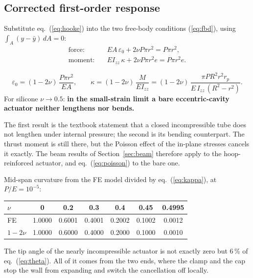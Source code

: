 \documentclass[11pt,a4paper]{article}
\numberwithin{equation}{section}
\newcommand{\Izz}{I_{zz}}
\newcommand{\rp}{r_p}
\begin{document}
\subsection{Corrected first-order response}
Substitute eq.~(\ref{eq:hooke}) into the two free-body conditions (\ref{eq:fbd}), using $\int_A (y-\bar y)\,dA = 0$:
\begin{align}
\text{force:}\quad & EA\,\varepsilon_0 + 2\nu P\pi r^2 = P\pi r^2,\\
\text{moment:}\quad & E\Izz\,\kappa + 2\nu P\pi r^2 e = P\pi r^2 e .
\end{align}
\begin{keyresult}
\begin{equation}
\varepsilon_0 = (1-2\nu)\,\frac{P\pi r^2}{EA},\qquad
\kappa = (1-2\nu)\,\frac{M}{E\Izz} = (1-2\nu)\,\frac{\pi P R^2 r^2 \rp}{E\,\Izz\,(R^2-r^2)} . \label{eq:poisson}
\end{equation}
For silicone $\nu\to 0.5$: \textbf{in the small-strain limit a bare eccentric-cavity actuator neither lengthens nor bends.}
\end{keyresult}

The first result is the textbook statement that a closed incompressible tube does not lengthen under internal pressure;
the second is its bending counterpart. The thrust moment is still there, but the Poisson effect of the in-plane stresses cancels it exactly.
The beam results of Section~\ref{sec:beam} therefore apply to the hoop-reinforced actuator, and eq.~(\ref{eq:poisson}) to the bare one.

\begin{remark}
Mid-span curvature from the FE model divided by eq.~(\ref{eq:kappa}), at $P/E=10^{-5}$:
\begin{center}\small
\begin{tabular}{@{}lcccccc@{}}
\toprule
$\nu$ & 0 & 0.2 & 0.3 & 0.4 & 0.45 & 0.4995\\
\midrule
FE & 1.0000 & 0.6001 & 0.4001 & 0.2002 & 0.1002 & 0.0012\\
$1-2\nu$ & 1.0000 & 0.6000 & 0.4000 & 0.2000 & 0.1000 & 0.0010\\
\bottomrule
\end{tabular}
\end{center}
The tip angle of the nearly incompressible actuator is not exactly zero but 6\,\% of eq.~(\ref{eq:theta}). All of it comes from the two ends,
where the clamp and the cap stop the wall from expanding and switch the cancellation off locally.
\end{remark}
\end{document}
